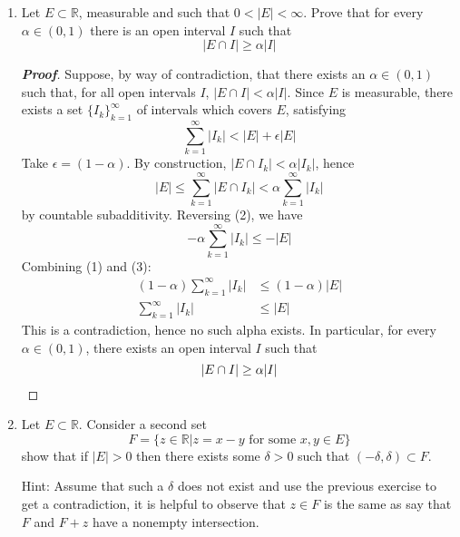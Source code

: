 \documentclass[12pt,leqno]{book}
\theoremstyle{definition}
\newcommand{\R}{\mathbb{R}}
\newenvironment{Proof}{\begin{proof}[\textnormal{\textbf{Proof}}]}{\end{proof}}
\begin{document}
\begin{enumerate}
\begin{Proof}
  \end{Proof}

  \item Let $E\subset\R$, measurable and such that $0<|E|<\infty$. Prove that for every $\alpha\in(0,1)$ there is an open interval $I$ such that \[|E\cap I|\geq\alpha|I|\]
\begin{Proof}
 Suppose, by way of contradiction, that there exists an $\alpha\in(0,1)$ such that, for all open intervals $I$, $|E\cap I|<\alpha|I|$. Since $E$ is measurable, there exists a set $\{I_k\}_{k=1}^{\infty}$ of intervals which covers $E$, satisfying \[\tag{1}\sum_{k=1}^{\infty}|I_k|<|E|+\epsilon|E|\] Take $\epsilon=(1-\alpha)$. By construction, $|E\cap I_k|<\alpha|I_k|$, hence \[\tag{2}|E|\leq\sum_{k=1}^{\infty}|E\cap I_k|<\alpha\sum_{k=1}^{\infty}|I_k|\] by countable subadditivity. Reversing (2), we have \[\tag{3}-\alpha\sum_{k=1}^{\infty}|I_k|\leq-|E|\] Combining (1) and (3): \begin{align*}(1-\alpha)\sum_{k=1}^{\infty}|I_k|&\leq(1-\alpha)|E|\\\sum_{k=1}^{\infty}|I_k|&\leq|E|\end{align*} This is a contradiction, hence no such alpha exists. In particular, for every $\alpha\in(0,1)$, there exists an open interval $I$ such that \[|E\cap I|\geq\alpha|I|\qedhere\]
\end{Proof}

  \item Let $E\subset\R$. Consider a second set \[F=\{z\in\R|z=x-y\text{ for some }x,y\in E\}\] show that if $|E|>0$ then there exists some $\delta>0$ such that $(-\delta,\delta)\subset F$.

      Hint: Assume that such a $\delta$ does not exist and use the previous exercise to get a contradiction, it is helpful to observe that $z\in F$ is the same as say that $F$ and $F+z$ have a nonempty intersection.

\end{enumerate}
\end{document}
